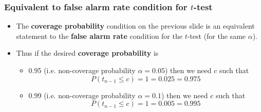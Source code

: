 \documentclass[a4paper]{article}
\begin{document}
\subsubsection{Equivalent to false alarm rate condition for \( t \)-test}
\begin{itemize}
	\item The \textcolor{myred}{\textbf{coverage probability}} condition on the previous slide is an equivalent statement to the \textcolor{mygreen}{\textbf{false alarm rate}}  condition for the \( t \)-test (for the same \( \alpha \)).
	\item Thus if the desired \textcolor{myred}{\textbf{coverage probability}} is
	\begin{itemize}
		\item 0.95 (i.e. non-coverage probability \( \alpha = 0.05 \)) then we need \( c \) such that
		\[
			P(t_{n-1} \leq c) = 1 =0.025 = 0.975
		\]
		\item 0.99 (i.e. non-coverage probability \( \alpha = 0.1 \)) then we need \( c \) such that
		\[
			P(t_{n-1} \leq c) = 1 =0.005 = 0.995
		\]
	\end{itemize}
\end{itemize}
\end{document}
